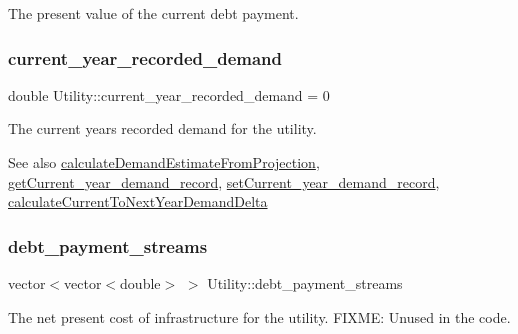 The present value of the current debt payment. 

\mbox{\label{classUtility_affc473409dadd1791e79aa9bbbe98dd2}} 
\subsubsection{\texorpdfstring{current\+\_\+year\+\_\+recorded\+\_\+demand}{current\_year\_recorded\_demand}}
{\footnotesize\ttfamily double Utility\+::current\+\_\+year\+\_\+recorded\+\_\+demand = 0\hspace{0.3cm}{\ttfamily [private]}}



The current year\textquotesingle{}s recorded demand for the utility. 

\begin{DoxySeeAlso}{See also}
\mbox{\hyperlink{classUtility_a10f96b2f34ba7e6e12a8e8fb98b8534a}{calculate\+Demand\+Estimate\+From\+Projection}}, \mbox{\hyperlink{classUtility_a67627ab2e5f526a979099bb6b2d2f13f}{get\+Current\+\_\+year\+\_\+demand\+\_\+record}}, \mbox{\hyperlink{classUtility_a0a3190b991d667caf30a2e7cf447fae1}{set\+Current\+\_\+year\+\_\+demand\+\_\+record}}, \mbox{\hyperlink{classUtility_a38381b003d13986e37757dfea683f7f9}{calculate\+Current\+To\+Next\+Year\+Demand\+Delta}} 
\end{DoxySeeAlso}
\mbox{\label{classUtility_aea06e0ef32e88d9eb34c2407d32bb42f}} 
\subsubsection{\texorpdfstring{debt\+\_\+payment\+\_\+streams}{debt\_payment\_streams}}
{\footnotesize\ttfamily vector$<$vector$<$double$>$ $>$ Utility\+::debt\+\_\+payment\+\_\+streams\hspace{0.3cm}{\ttfamily [private]}}



The net present cost of infrastructure for the utility. F\+I\+X\+ME\+: Unused in the code. 

